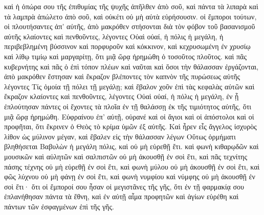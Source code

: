 \begin{pages}
\begin{Rightside}
		\pend
		\pstart
		καὶ ἡ ὀπώρα σου τῆς ἐπιθυμίας τῆς ψυχῆς ἀπῆλθεν ἀπὸ σοῦ, καὶ πάντα τὰ λιπαρὰ καὶ τὰ λαμπρὰ ἀπώλετο ἀπὸ σοῦ, καὶ οὐκέτι οὐ μὴ αὐτὰ εὑρήσουσιν. 
		\pend
		\pstart
		οἱ ἔμποροι τούτων, οἱ πλουτήσαντες ἀπ’ αὐτῆς, ἀπὸ μακρόθεν στήσονται διὰ τὸν φόβον τοῦ βασανισμοῦ αὐτῆς κλαίοντες καὶ πενθοῦντες, λέγοντες Οὐαὶ οὐαί, ἡ πόλις ἡ μεγάλη, ἡ περιβεβλημένη βύσσινον καὶ πορφυροῦν καὶ κόκκινον, καὶ κεχρυσωμένη ἐν χρυσίῳ καὶ λίθῳ τιμίῳ καὶ μαργαρίτῃ, ὅτι μιᾷ ὥρᾳ ἠρημώθη ὁ τοσοῦτος πλοῦτος. 
		\pend
		\pstart
		καὶ πᾶς κυβερνήτης καὶ πᾶς ὁ ἐπὶ τόπον πλέων καὶ ναῦται καὶ ὅσοι τὴν θάλασσαν ἐργάζονται, ἀπὸ μακρόθεν ἔστησαν καὶ ἔκραζον βλέποντες τὸν καπνὸν τῆς πυρώσεως αὐτῆς λέγοντες Τίς ὁμοία τῇ πόλει τῇ μεγάλῃ; καὶ ἔβαλον χοῦν ἐπὶ τὰς κεφαλὰς αὐτῶν καὶ ἔκραζον κλαίοντες καὶ πενθοῦντες, λέγοντες Οὐαὶ οὐαί, ἡ πόλις ἡ μεγάλη, ἐν ᾗ ἐπλούτησαν πάντες οἱ ἔχοντες τὰ πλοῖα ἐν τῇ θαλάσσῃ ἐκ τῆς τιμιότητος αὐτῆς, ὅτι μιᾷ ὥρᾳ ἠρημώθη. Εὐφραίνου ἐπ’ αὐτῇ, οὐρανέ καὶ οἱ ἅγιοι καὶ οἱ ἀπόστολοι καὶ οἱ προφῆται, ὅτι ἔκρινεν ὁ Θεὸς τὸ κρίμα ὑμῶν ἐξ αὐτῆς. 
		\pend
		\pstart
		Καὶ ἦρεν εἷς ἄγγελος ἰσχυρὸς λίθον ὡς μύλινον μέγαν, καὶ ἔβαλεν εἰς τὴν θάλασσαν λέγων Οὕτως ὁρμήματι βληθήσεται Βαβυλὼν ἡ μεγάλη πόλις, καὶ οὐ μὴ εὑρεθῇ ἔτι. καὶ φωνὴ κιθαρῳδῶν καὶ μουσικῶν καὶ αὐλητῶν καὶ σαλπιστῶν οὐ μὴ ἀκουσθῇ ἐν σοὶ ἔτι, καὶ πᾶς τεχνίτης πάσης τέχνης οὐ μὴ εὑρεθῇ ἐν σοὶ ἔτι, καὶ φωνὴ μύλου οὐ μὴ ἀκουσθῇ ἐν σοὶ ἔτι, καὶ φῶς λύχνου οὐ μὴ φάνῃ ἐν σοὶ ἔτι, καὶ φωνὴ νυμφίου καὶ νύμφης οὐ μὴ ἀκουσθῇ ἐν σοὶ ἔτι· ὅτι οἱ ἔμποροί σου ἦσαν οἱ μεγιστᾶνες τῆς γῆς, ὅτι ἐν τῇ φαρμακίᾳ σου ἐπλανήθησαν πάντα τὰ ἔθνη, καὶ ἐν αὐτῇ αἷμα προφητῶν καὶ ἁγίων εὑρέθη καὶ πάντων τῶν ἐσφαγμένων ἐπὶ τῆς γῆς.				
		\pend
        \endnumbering
    \end{Rightside}
    \begin{Leftside}
        \beginnumbering
				

\end{Leftside}
\end{pages}
